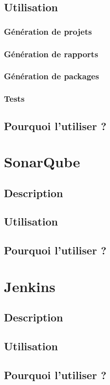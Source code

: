 \documentclass{article}
\begin{document}
\subsection{Utilisation}
\subsubsection{Génération de projets}
\subsubsection{Génération de rapports}
\subsubsection{Génération de packages}
\subsubsection{Tests}
\subsection{Pourquoi l'utiliser ?}


\section{SonarQube}
\subsection{Description}
\subsection{Utilisation}
\subsection{Pourquoi l'utiliser ?}


\section{Jenkins}
\subsection{Description}
\subsection{Utilisation}
\subsection{Pourquoi l'utiliser ?}
\end{document}
